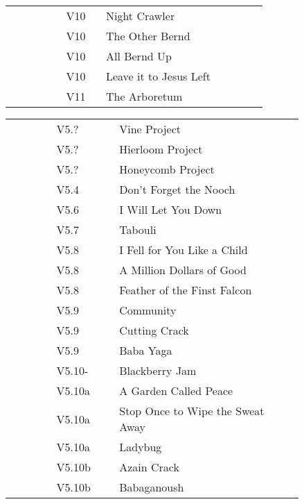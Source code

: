 \begin{flushleft}
\begin{center}
\begin{supertabular}{p{0.18\linewidth}p{0.13\linewidth}p{0.45\linewidth}p{0.08\linewidth}}
 &V10&Night Crawler & \pageref{rt:Night Crawler} \\
 &V10&The Other Bernd & \pageref{rt:The Other Bernd} \\
 &V10&All Bernd Up & \pageref{rt:All Bernd Up} \\
 &V10&Leave it to Jesus Left & \pageref{vr:Leave it to Jesus Left} \\
 &V11&The Arboretum & \pageref{rt:The Arboretum} \\
\end{supertabular}
\begin{supertabular}{p{0.13\linewidth}p{0.18\linewidth}p{0.45\linewidth}p{0.08\linewidth}}
&V5.?&Vine Project & \pageref{rt:Vine Project} \\
&V5.?&Hierloom Project & \pageref{rt:Hierloom Project} \\
&V5.?&Honeycomb Project & \pageref{rt:Honeycomb Project} \\
&V5.4&Don't Forget the Nooch & \pageref{rt:Don't Forget the Nooch} \\
&V5.6&I Will Let You Down & \pageref{rt:I Will Let You Down} \\
&V5.7&Tabouli & \pageref{rt:Tabouli} \\
&V5.8&I Fell for You Like a Child & \pageref{rt:I Fell for You Like a Child} \\
&V5.8&A Million Dollars of Good & \pageref{rt:A Million Dollars of Good} \\
&V5.8&Feather of the Finst Falcon & \pageref{rt:Feather of the Finst Falcon} \\
&V5.9&Community & \pageref{rt:Community} \\
&V5.9&Cutting Crack & \pageref{rt:Cutting Crack} \\
&V5.9&Baba Yaga & \pageref{rt:Baba Yaga} \\
&V5.10-&Blackberry Jam & \pageref{rt:Blackberry Jam} \\
&V5.10a&A Garden Called Peace & \pageref{rt:A Garden Called Peace} \\
&V5.10a&Stop Once to Wipe the Sweat Away & \pageref{rt:Stop Once to Wipe the Sweat Away} \\
&V5.10a&Ladybug & \pageref{rt:Ladybug} \\
&V5.10b&Azain Crack & \pageref{rt:Azain Crack} \\
&V5.10b&Babaganoush & \pageref{rt:Babaganoush} \\

\end{supertabular}
\end{center}
\end{flushleft}
